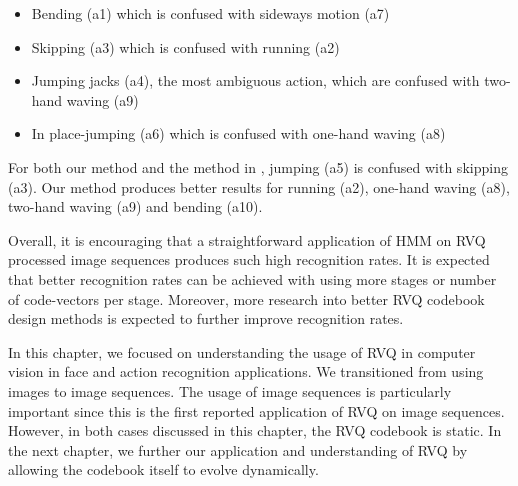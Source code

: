 \begin{itemize}
\item Bending (a1) which is confused with sideways motion (a7)
\item Skipping (a3) which is confused with running (a2)
\item Jumping jacks (a4), the most ambiguous action, which are confused with two-hand waving (a9)
\item In place-jumping (a6) which is confused with one-hand waving (a8)
\end{itemize}

For both our method and the method in \cite{2007_JNL_SpaceTimeShapes_Gorelick}, jumping (a5) is confused with skipping (a3).  Our method produces better results for running (a2), one-hand waving (a8), two-hand waving (a9) and bending (a10).  

Overall, it is encouraging that a straightforward application of HMM on RVQ processed image sequences produces such high recognition rates.  It is expected that better recognition rates can be achieved with using more stages or number of code-vectors per stage.  Moreover, more research into better RVQ codebook design methods is expected to further improve recognition rates.  

In this chapter, we focused on understanding the usage of RVQ in computer vision in face and action recognition applications.  We transitioned from using images to image sequences.  The usage of image sequences is particularly important since this is the first reported application of RVQ on image sequences.  However, in both cases discussed in this chapter, the RVQ codebook is static.  In the next chapter, we further our application and understanding of RVQ by allowing the codebook itself to evolve dynamically.